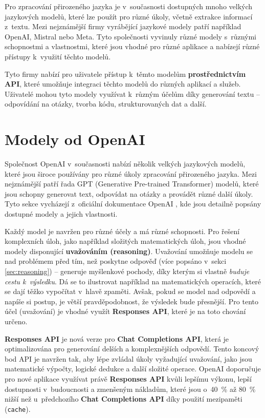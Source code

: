 \documentclass[czech, bc, kiv, he, iso690numb, pdf]{fasthesis}
\begin{document}
Pro zpracování přirozeného jazyka je v~současnosti dostupných mnoho velkých jazykových modelů, které lze použít pro různé úkoly, včetně extrakce informací z~textu. Mezi nejznámější firmy vyrábějící jazykové modely patří například OpenAI, Mistral nebo Meta. Tyto společnosti vyvinuly různé modely s~různými schopnostmi a vlastnostmi, které jsou vhodné pro různé aplikace a nabízejí různé přístupy k~využití těchto modelů.

Tyto firmy nabízí pro uživatele přístup k~těmto modelům \textbf{prostřednictvím API}, které umožňuje integraci těchto modelů do různých aplikací a služeb. Uživatelé mohou tyto modely využívat k~různým účelům díky generování textu -- odpovídání na otázky, tvorba kódu, strukturovaných dat a další.

\section{Modely od OpenAI}
Společnost OpenAI v~současnosti nabízí několik velkých jazykových modelů, které jsou široce používány pro různé úkoly zpracování přirozeného jazyka. Mezi nejznámější patří řada GPT (Generative Pre-trained Transformer) modelů, které jsou schopny generovat text, odpovídat na otázky a provádět různé další úkoly. Tyto sekce vycházejí z~oficiální dokumentace OpenAI \cite{openai-platform-models}, kde jsou detailně popsány dostupné modely a jejich vlastnosti.

Každý model je navržen pro různé účely a má různé schopnosti. Pro řešení komplexních úloh, jako například složitých matematických úloh, jsou vhodné modely disponující \textbf{uvažováním (reasoning)}. Uvažování umožňuje modelu se  nad problémem před tím, než poskytne odpověď (více popsáno v~sekci \ref{sec:reasoning}) -- generuje myšlenkové pochody, díky kterým si vlastně \textit{buduje cestu k~výsledku}. Dá se to ilustrovat například na matematických operacích, které se dají těžko vypočítat v~hlavě zpaměti. Avšak, pokud se model nad odpovědí  a napíše si postup, je větší pravděpodobnost, že výsledek bude přesnější. Pro tento účel (uvažování) je vhodné využít \textbf{Responses API}, které je na toto chování určeno.

\textbf{Responses API} je nová verze pro \textbf{Chat Completions API}, která je optimalizována pro generování delších a komplexnějších odpovědí. Tento koncový bod API je navržen tak, aby lépe zvládal úkoly vyžadující uvažování, jako jsou matematické výpočty, logické dedukce a další složité operace. OpenAI \cite{openai-platform-migrate-responses} doporučuje pro nové aplikace využívat právě \textbf{Responses API} kvůli lepšímu výkonu, lepší dostupnosti v~budoucnosti a zmenšeným nákladům, které jsou o~40~\% až 80~\% nižší než u~předchozího \textbf{Chat Completions API} díky použití mezipaměti (\texttt{cache}).
\end{document}
